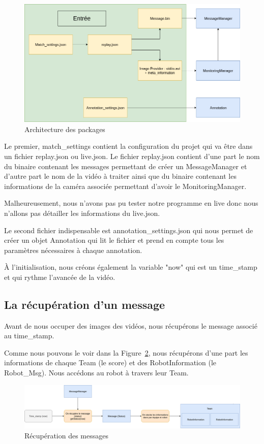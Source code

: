\begin{figure}[H] 
\centering 
\includegraphics[scale = 0.3]{images/init.png}
    \caption{Architecture des packages}
    \label{fig:archi}
\end{figure} 
\bigskip


Le premier, match\_settings contient la configuration du projet qui va être dans un fichier replay.json ou live.json.
Le fichier replay.json contient d'une part le nom du binaire contenant les messages permettant de créer un MessageManager et d'autre part le nom de la vidéo à traiter ainsi que du binaire contenant les informations de la caméra associée permettant d'avoir le MonitoringManager.
\bigskip

Malheureusement, nous n'avons pas pu tester notre programme en live donc nous n'allons pas détailler les informations du live.json.
\bigskip

Le second fichier indispensable est annotation\_settings.json qui nous permet de créer un objet Annotation qui lit le fichier et prend en compte tous les paramètres nécessaires à chaque annotation.

À l'initialisation, nous créons également la variable "now" qui est un time\_stamp et qui rythme l'avancée de la vidéo.

\subsection{La récupération d'un message}

Avant de nous occuper des images des vidéos, nous récupérons le message associé au time\_stamp. 

Comme nous pouvons le voir dans la Figure~\ref{fig:log}, nous récupérons d'une part les informations de chaque Team (le score) et des RobotInformation (le Robot\_Msg). Nous accédons au robot à travers leur Team.
\begin{figure}[h] 
\centering 
\includegraphics[scale = 0.24]{images/logs.png}
    \caption{Récupération des messages}
    \label{fig:log}
\end{figure} 


